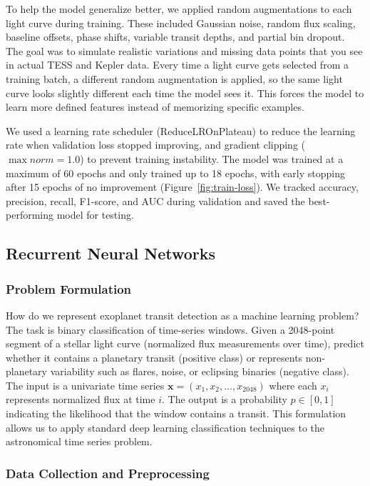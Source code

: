 \documentclass[letterpaper]{article} %
\begin{document}
To help the model generalize better, we applied random augmentations to each light curve during training. These included Gaussian noise, random flux scaling, baseline offsets, phase shifts, variable transit depths, and partial bin dropout. The goal was to simulate realistic variations and missing data points that you see in actual TESS and Kepler data. Every time a light curve gets selected from a training batch, a different random augmentation is applied, so the same light curve looks slightly different each time the model sees it. This forces the model to learn more defined features instead of memorizing specific examples.

We used a learning rate scheduler (ReduceLROnPlateau) to reduce the learning rate when validation loss stopped improving, and gradient clipping ($\max norm=1.0$) to prevent training instability. The model was trained at a maximum of 60 epochs and only trained up to 18 epochs, with early stopping after 15 epochs of no improvement (Figure~\ref{fig:train-loss}). We tracked accuracy, precision, recall, F1-score, and AUC during validation and saved the best-performing model for testing.


\subsection{Recurrent Neural Networks}

\subsubsection{Problem Formulation}

How do we represent exoplanet transit detection as a machine learning problem? The task is binary classification of time-series windows. Given a 2048-point segment of a stellar light curve (normalized flux measurements over time), predict whether it contains a planetary transit (positive class) or represents non-planetary variability such as flares, noise, or eclipsing binaries (negative class). The input is a univariate time series $\mathbf{x} = (x_1, x_2, \ldots, x_{2048})$ where each $x_i$ represents normalized flux at time $i$. The output is a probability $p \in [0,1]$ indicating the likelihood that the window contains a transit. This formulation allows us to apply standard deep learning classification techniques to the astronomical time series problem.

\subsubsection{Data Collection and Preprocessing}
\end{document}
